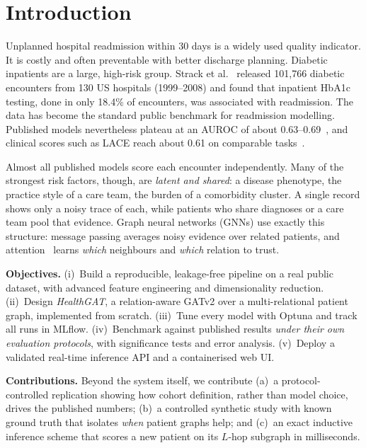 \documentclass[conference]{IEEEtran}
\begin{document}
\section{Introduction}
Unplanned hospital readmission within 30 days is a widely used quality indicator. It is costly
and often preventable with better discharge planning. Diabetic inpatients are a large, high-risk
group. Strack et al.~\cite{strack2014} released 101{,}766 diabetic encounters from 130 US
hospitals (1999--2008) and found that inpatient HbA1c testing, done in only 18.4\% of
encounters, was associated with readmission. The data has become the standard public benchmark
for readmission modelling. Published models nevertheless plateau at an AUROC of about
0.63--0.69~\cite{emijohnson2025,salim2026}, and
clinical scores such as LACE reach about 0.61 on comparable tasks~\cite{tang2023,vanwalraven2010}.

Almost all published models score each encounter independently. Many of the strongest risk
factors, though, are \emph{latent and shared}: a disease phenotype, the practice style of a care
team, the burden of a comorbidity cluster. A single record shows only a noisy trace of each,
while patients who share diagnoses or a care team pool that evidence. Graph neural networks
(GNNs) use exactly this structure: message passing averages noisy evidence over related
patients, and attention~\cite{velickovic2018,brody2022} learns \emph{which} neighbours and
\emph{which} relation to trust.

\textbf{Objectives.} (i)~Build a reproducible, leakage-free pipeline on a real public dataset,
with advanced feature engineering and dimensionality reduction. (ii)~Design \emph{HealthGAT}, a
relation-aware GATv2 over a multi-relational patient graph, implemented from scratch.
(iii)~Tune every model with Optuna and track all runs in MLflow. (iv)~Benchmark against published
results \emph{under their own evaluation protocols}, with significance tests and error analysis.
(v)~Deploy a validated real-time inference API and a containerised web UI.

\textbf{Contributions.} Beyond the system itself, we contribute (a)~a protocol-controlled
replication showing how cohort definition, rather than model choice, drives the published
numbers; (b)~a controlled synthetic study with known ground truth that isolates \emph{when}
patient graphs help; and (c)~an exact inductive inference scheme that scores a new patient on
its $L$-hop subgraph in milliseconds.

\end{document}
